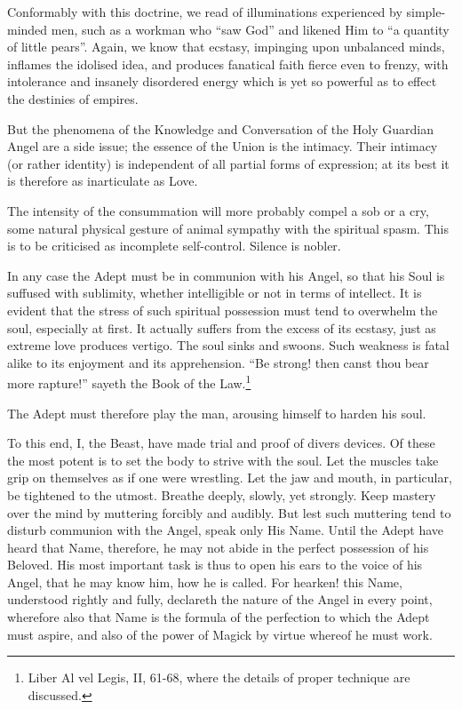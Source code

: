 Conformably with this doctrine, we read of illuminations experienced by simple-minded men, such as a workman who \enquote{saw God} and likened Him to \enquote{a quantity of little pears}. Again, we know that ecstasy, impinging upon unbalanced minds, inflames the idolised idea, and produces fanatical faith fierce even to frenzy, with intolerance and insanely disordered energy which is yet so powerful as to effect the destinies of empires.

But the phenomena of the Knowledge and Conversation of the Holy Guardian Angel are a side issue; the essence of the Union is the intimacy. Their intimacy (or rather identity) is independent of all partial forms of expression; at its best it is therefore as inarticulate as Love.

The intensity of the consummation will more probably compel a sob or a cry, some natural physical gesture of animal sympathy with the spiritual spasm. This is to be criticised as incomplete self-control. Silence is nobler.

In any case the Adept must be in communion with his Angel, so that his Soul is suffused with sublimity, whether intelligible or not in terms of intellect. It is evident that the stress of such spiritual possession must tend to overwhelm the soul, especially at first. It actually suffers from the excess of its ecstasy, just as extreme love produces vertigo. The soul sinks and swoons. Such weakness is fatal alike to its enjoyment and its apprehension. \enquote{Be strong! then canst thou bear more rapture!} sayeth the Book of the Law.\footnote{Liber Al vel Legis, II, 61-68, where the details of proper technique are discussed.}

The Adept must therefore play the man, arousing himself to harden his soul.

To this end, I, the Beast, have made trial and proof of divers devices. Of these the most potent is to set the body to strive with the soul. Let the muscles take grip on themselves as if one were wrestling. Let the jaw and mouth, in particular, be tightened to the utmost. Breathe deeply, slowly, yet strongly. Keep mastery over the mind by muttering forcibly and audibly. But lest such muttering tend to disturb communion with the Angel, speak only His Name. Until the Adept have heard that Name, therefore, he may not abide in the perfect possession of his Beloved. His most important task is thus to open his ears to the voice of his Angel, that he may know him, how he is called. For hearken! this Name, understood rightly and fully, declareth the nature of the Angel in every point, wherefore also that Name is the formula of the perfection to which the Adept must aspire, and also of the power of Magick by virtue whereof he must work.

